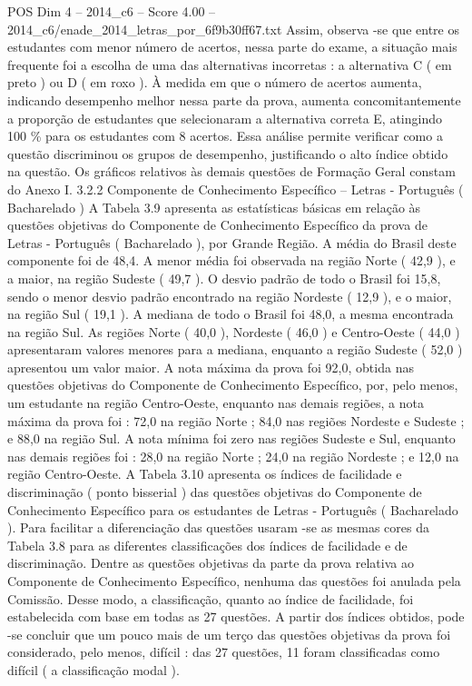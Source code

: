 \begin{textsample}{POS Dim 4 – 2014\_c6 – Score 4.00 – 2014\_c6/enade\_2014\_letras\_por\_6f9b30ff67.txt}
Assim, observa -se que entre os estudantes com menor número de acertos, nessa parte do exame, a situação mais frequente foi a escolha de uma das alternativas incorretas : a alternativa C ( em preto ) ou D ( em roxo ).
À medida em que o número de acertos aumenta, indicando desempenho melhor nessa parte da prova, aumenta concomitantemente a proporção de estudantes que selecionaram a alternativa correta E, atingindo 100 \% para os estudantes com 8 acertos.
Essa análise permite verificar como a questão discriminou os grupos de desempenho, justificando o alto índice obtido na questão.
Os gráficos relativos às demais questões de Formação Geral constam do Anexo I. 3.2.2 Componente de Conhecimento Específico – Letras - Português ( Bacharelado ) A Tabela 3.9 apresenta as estatísticas básicas em relação às questões objetivas do Componente de Conhecimento Específico da prova de Letras - Português ( Bacharelado ), por Grande Região.
A média do Brasil deste componente foi de 48,4.
A menor média foi observada na região Norte ( 42,9 ), e a maior, na região Sudeste ( 49,7 ).
O desvio padrão de todo o Brasil foi 15,8, sendo o menor desvio padrão encontrado na região Nordeste ( 12,9 ), e o maior, na região Sul ( 19,1 ).
A mediana de todo o Brasil foi 48,0, a mesma encontrada na região Sul.
As regiões Norte ( 40,0 ), Nordeste ( 46,0 ) e Centro-Oeste ( 44,0 ) apresentaram valores menores para a mediana, enquanto a região Sudeste ( 52,0 ) apresentou um valor maior.
A nota máxima da prova foi 92,0, obtida nas questões objetivas do Componente de Conhecimento Específico, por, pelo menos, um estudante na região Centro-Oeste, enquanto nas demais regiões, a nota máxima da prova foi : 72,0 na região Norte ; 84,0 nas regiões Nordeste e Sudeste ; e 88,0 na região Sul.
A nota mínima foi zero nas regiões Sudeste e Sul, enquanto nas demais regiões foi : 28,0 na região Norte ; 24,0 na região Nordeste ; e 12,0 na região Centro-Oeste.
A Tabela 3.10 apresenta os índices de facilidade e discriminação ( ponto bisserial ) das questões objetivas do Componente de Conhecimento Específico para os estudantes de Letras - Português ( Bacharelado ).
Para facilitar a diferenciação das questões usaram -se as mesmas cores da Tabela 3.8 para as diferentes classificações dos índices de facilidade e de discriminação.
Dentre as questões objetivas da parte da prova relativa ao Componente de Conhecimento Específico, nenhuma das questões foi anulada pela Comissão.
Desse modo, a classificação, quanto ao índice de facilidade, foi estabelecida com base em todas as 27 questões.
A partir dos índices obtidos, pode -se concluir que um pouco mais de um terço das questões objetivas da prova foi considerado, pelo menos, difícil : das 27 questões, 11 foram classificadas como difícil ( a classificação modal ).

\end{textsample}
